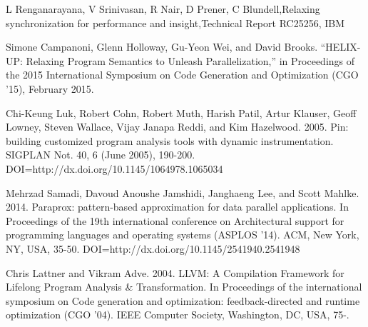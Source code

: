 \documentclass[12pt,conference]{IEEEtran}
\begin{document}
%
%
%
\begin{thebibliography}{9}

L Renganarayana, V Srinivasan, R Nair, D Prener, C Blundell,Relaxing synchronization for performance and insight,Technical Report RC25256, IBM 

Simone Campanoni, Glenn Holloway, Gu-Yeon Wei, and David Brooks. “HELIX-UP: Relaxing
Program Semantics to Unleash Parallelization,” in Proceedings of the 2015 International
Symposium on Code Generation and Optimization (CGO ’15), February 2015.

Chi-Keung Luk, Robert Cohn, Robert Muth, Harish Patil, Artur Klauser, Geoff Lowney, Steven Wallace, Vijay Janapa Reddi, and Kim Hazelwood. 2005. Pin: building customized program analysis tools with dynamic instrumentation. SIGPLAN Not. 40, 6 (June 2005), 190-200. DOI=http://dx.doi.org/10.1145/1064978.1065034

Mehrzad Samadi, Davoud Anoushe Jamshidi, Janghaeng Lee, and Scott Mahlke. 2014. Paraprox: pattern-based approximation for data parallel applications. In Proceedings of the 19th international conference on Architectural support for programming languages and operating systems (ASPLOS '14). ACM, New York, NY, USA, 35-50. DOI=http://dx.doi.org/10.1145/2541940.2541948

Chris Lattner and Vikram Adve. 2004. LLVM: A Compilation Framework for Lifelong Program Analysis \& Transformation. In Proceedings of the international symposium on Code generation and optimization: feedback-directed and runtime optimization (CGO '04). IEEE Computer Society, Washington, DC, USA, 75-.

\end{thebibliography}
\end{document}
